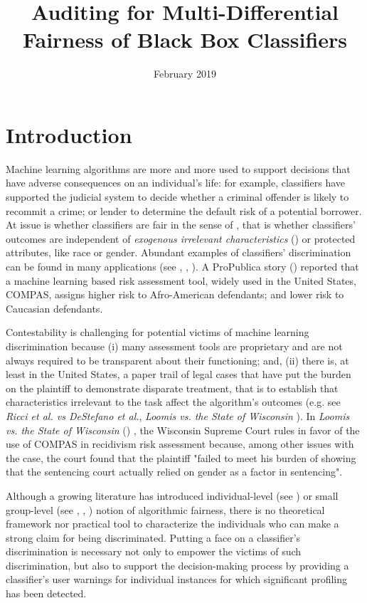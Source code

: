 \documentclass{article}
\title{Auditing for Multi-Differential Fairness of Black Box Classifiers}
\author{}
\date{February 2019}
\begin{document}
\maketitle
\section{Introduction}
Machine learning algorithms are more and more used to support decisions that have adverse consequences on an individual's life: for example, classifiers have supported the judicial system to decide whether a criminal offender is likely to recommit a crime; or lender to determine the default risk of a potential borrower. At issue is whether classifiers are fair in the sense of \cite{calsamiglia2009decentralizing} , that is whether classifiers' outcomes are independent of \textit{exogenous irrelevant characteristics} (\cite{calsamiglia2009decentralizing}) or protected attributes, like race or gender. Abundant examples of classifiers' discrimination can be found in many applications (see \cite{NY2017}, \cite{atlantic2016}, \cite{ProPublica2016}). A ProPublica story (\cite{ProPublica2016}) reported that a machine learning based risk assessment tool, widely used in the United States, COMPAS, assigns higher risk to Afro-American defendants; and lower risk to Caucasian defendants.

\bigskip
Contestability is challenging for potential victims of machine learning discrimination because (i) many assessment tools are proprietary and are not always required to be transparent about their functioning; and, (ii) there is, at least in the United States, a paper trail of legal cases that have put the burden on the plaintiff to demonstrate disparate treatment, that is to establish that characteristics irrelevant to the task affect the algorithm's outcomes (e.g. see \textit{Ricci et al. vs DeStefano et al.}\cite{Ricci}, \textit{Loomis vs. the State of Wisconsin} \cite{Loomis}). In  \textit{Loomis vs. the State of Wisconsin} (\cite{Loomis}) , the Wisconsin Supreme Court rules in favor of the use of COMPAS in recidivism risk assessment because, among other issues with the case, the court found that the plaintiff "failed to meet his burden of showing that the sentencing court actually relied on gender as a factor in sentencing".

\bigskip
Although a growing literature has introduced individual-level (see \cite{dwork2012fairness}) or small group-level (see \cite{hebert2017calibration}, \cite{kearns2017preventing}, \cite{kim2018fairness}) notion of algorithmic fairness, there is no theoretical framework nor practical tool to  characterize the individuals who can make a strong claim for being discriminated. Putting a face on a classifier's discrimination is necessary not only to empower the victims of such discrimination, but also to support the decision-making process by providing a classifier's user warnings for individual instances for which significant profiling has been detected.
\end{document}
